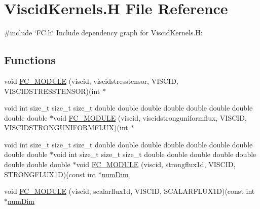 \hypertarget{ViscidKernels_8H}{}\section{Viscid\+Kernels.\+H File Reference}
\label{ViscidKernels_8H}
{\ttfamily \#include \char`\"{}F\+C.\+h\char`\"{}}\newline
Include dependency graph for Viscid\+Kernels.\+H\+:
\subsection*{Functions}
\begin{DoxyCompactItemize}
\item 
void \hyperlink{ViscidKernels_8H_aaf2ad72ff290b2e910c220179f854b32}{F\+C\+\_\+\+M\+O\+D\+U\+LE} (viscid, viscidstresstensor, V\+I\+S\+C\+ID, V\+I\+S\+C\+I\+D\+S\+T\+R\+E\+S\+S\+T\+E\+N\+S\+OR)(int $\ast$
\item 
void int size\+\_\+t size\+\_\+t size\+\_\+t double double double double double double double double double $\ast$void \hyperlink{ViscidKernels_8H_abfc2b4c02899d1cd021cde740ed1c125}{F\+C\+\_\+\+M\+O\+D\+U\+LE} (viscid, viscidstronguniformflux, V\+I\+S\+C\+ID, V\+I\+S\+C\+I\+D\+S\+T\+R\+O\+N\+G\+U\+N\+I\+F\+O\+R\+M\+F\+L\+UX)(int $\ast$
\item 
void int size\+\_\+t size\+\_\+t size\+\_\+t double double double double double double double double double $\ast$void int size\+\_\+t size\+\_\+t size\+\_\+t double double double double double double double double $\ast$void \hyperlink{ViscidKernels_8H_a5fe180053e1ad03853af7a0d4a2c6955}{F\+C\+\_\+\+M\+O\+D\+U\+LE} (viscid, strongflux1d, V\+I\+S\+C\+ID, S\+T\+R\+O\+N\+G\+F\+L\+U\+X1D)(const int $\ast$\hyperlink{SATKernels_8H_a680185db8546de161968dabace9e94f1}{num\+Dim}
\item 
void \hyperlink{ViscidKernels_8H_a0a1716a9309bfc8722490626f294ab4c}{F\+C\+\_\+\+M\+O\+D\+U\+LE} (viscid, scalarflux1d, V\+I\+S\+C\+ID, S\+C\+A\+L\+A\+R\+F\+L\+U\+X1D)(const int $\ast$\hyperlink{SATKernels_8H_a680185db8546de161968dabace9e94f1}{num\+Dim}
\end{DoxyCompactItemize}
